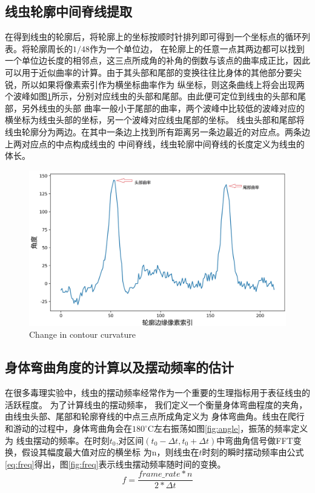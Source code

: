 \subsection{线虫轮廓中间脊线提取}
	在得到线虫的轮廓后，将轮廓上的坐标按顺时针排列即可得到一个坐标点的循环列表。将轮廓周长的$1/48$作为一个单位边，
	在轮廓上的任意一点其两边都可以找到一个单位边长度的相邻点，这三点所成角的补角的倒数与该点的曲率成正比，因此
	可以用于近似曲率的计算。由于其头部和尾部的变换往往比身体的其他部分要尖锐，所以如果将像素索引作为横坐标曲率作为
	纵坐标，则这条曲线上将会出现两个波峰如图\ref{fig:qulv}所示，分别对应线虫的头部和尾部。由此便可定位到线虫的头部和尾部，另外线虫的头部
	曲率一般小于尾部的曲率，两个波峰中比较低的波峰对应的横坐标为线虫头部的坐标，另一个波峰对应线虫尾部的坐标。
	线虫头部和尾部将线虫轮廓分为两边。在其中一条边上找到所有距离另一条边最近的对应点。两条边上两对应点的中点构成线虫的
	中间脊线，线虫轮廓中间脊线的长度定义为线虫的体长。
	\begin{figure}[h]
	  \centering
	  \includegraphics[width=14cm]{figure/chap3/qulv.jpg}
		{Change in contour curvature}
	  \label{fig:qulv}
	\end{figure}
\subsection{身体弯曲角度的计算以及摆动频率的估计}
	在很多毒理实验中，线虫的摆动频率经常作为一个重要的生理指标用于表征线虫的活跃程度\cite{Wang2008Assessment}。
	为了计算线虫的摆动频率， 我们定义一个衡量身体弯曲程度的夹角，由线虫头部、尾部和轮廓脊线的中点三点所成角定义为
	身体弯曲角。线虫在爬行和游动的过程中，身体弯曲角会在$180^\circ$C左右振荡如图\ref{fig:angle}，振荡的频率定义为
	线虫摆动的频率。在时刻$t_0$,对区间$(t_0-\Delta t,t_0+\Delta t)$中弯曲角信号做FFT变换，假设其幅度最大值对应的横坐标
	为n，则线虫在$t$时刻的瞬时摆动频率由公式\ref{eq:freq}得出，图\ref{fig:freq}表示线虫摆动频率随时间的变换。
	\begin{equation}
        f=\frac{frame\_rate*n}{2*\Delta t} \label{eq:freq}
		\end{equation}
		
